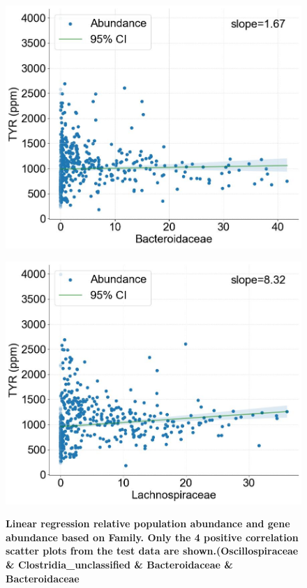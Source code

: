 \documentclass[12pt]{article}
\begin{document}
\begin{figure}[H]
    \vspace{1em} 
    
    \begin{minipage}{0.48\linewidth}
        \centering
        \includegraphics[width=\linewidth, height=0.8\linewidth]{pic/family/family3.jpg}
        \label{fig:image3}
    \end{minipage}
    \hfill
    \begin{minipage}{0.48\linewidth}
        \centering
        \includegraphics[width=\linewidth, height=0.8\linewidth]{pic/family/family4.jpg}
        \label{fig:image4}
    \end{minipage}

   \caption{\small\bfseries Linear regression relative population abundance and gene abundance based on Family. Only the 4 positive correlation scatter plots from the test data are shown.(Oscillospiraceae \& Clostridia\_unclassified \& Bacteroidaceae \& Bacteroidaceae}
\end{figure}
\end{document}
